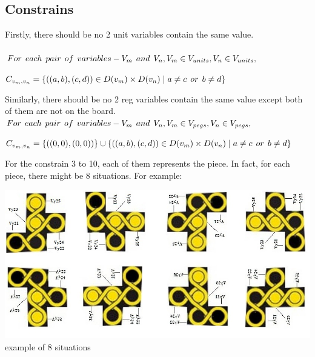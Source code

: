 \subsection{Constrains}
Firstly, there should be no 2 unit variables contain the same value.\\
\\ $For \hspace{1ex} each \hspace{1ex} pair\hspace{1ex} of \hspace{1ex}variables-V_{m} \hspace{1ex} and \hspace{1ex} V_{n}, V_{m} \in V_{units}, V_{n} \in V_{units},$
\begin{center}
$C_{v_{m},v_{n}}=\{((a,b),(c,d))\in D(v_{m}) \times D(v_{n})\mid a \neq c   \hspace{1ex} or \hspace{1ex}  b \neq d\}$
\end{center}
Similarly, there should be no 2 reg variables contain the same value except both of them are not on the board.\\
$For \hspace{1ex} each \hspace{1ex} pair \hspace{1ex} of\hspace{1ex} variables-V_{m}\hspace{1ex} and \hspace{1ex}V_{n}, V_{m} \in V_{pegs}, V_{n} \in V_{pegs},$
\begin{center}
$C_{v_{m},v_{n}}=\{((0,0),(0,0))\}\cup \{((a,b),(c,d))\in D(v_{m})\times D(v_{n})\mid a \neq c   \hspace{1ex} or \hspace{1ex}  b \neq d\}$\\
\end{center}
For the constrain 3 to 10, each of them represents the piece. In fact, for each piece, there might be 8 situations. For example:
\begin{center}
\includegraphics[scale=0.5]{domainexplain.jpg}\\
example of 8 situations
\end{center}
